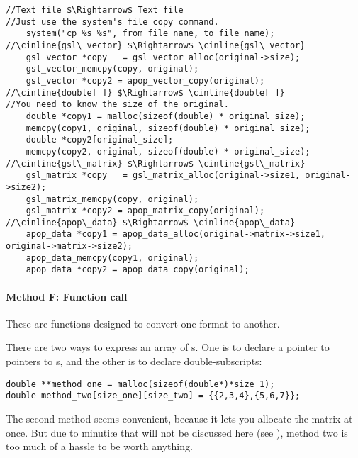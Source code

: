  
  
\begin{lstlisting}
//Text file $\Rightarrow$ Text file
//Just use the system's file copy command.
    system("cp %s %s", from_file_name, to_file_name);
//\cinline{gsl\_vector} $\Rightarrow$ \cinline{gsl\_vector}
    gsl_vector *copy   = gsl_vector_alloc(original->size);
    gsl_vector_memcpy(copy, original);
    gsl_vector *copy2 = apop_vector_copy(original);
//\cinline{double[ ]} $\Rightarrow$ \cinline{double[ ]}
//You need to know the size of the original.
    double *copy1 = malloc(sizeof(double) * original_size);
    memcpy(copy1, original, sizeof(double) * original_size);
    double *copy2[original_size];
    memcpy(copy2, original, sizeof(double) * original_size);
//\cinline{gsl\_matrix} $\Rightarrow$ \cinline{gsl\_matrix}
    gsl_matrix *copy   = gsl_matrix_alloc(original->size1, original->size2);
    gsl_matrix_memcpy(copy, original);
    gsl_matrix *copy2 = apop_matrix_copy(original);
//\cinline{apop\_data} $\Rightarrow$ \cinline{apop\_data}
    apop_data *copy1 = apop_data_alloc(original->matrix->size1, original->matrix->size2);
    apop_data_memcpy(copy1, original);
    apop_data *copy2 = apop_data_copy(original);
\end{lstlisting}

\paragraph{Method F: Function call}
 
 
 

These are functions designed to convert one format to another.

There are two ways to express an array of s. One is to
declare a pointer to pointers to s, and the other is to
declare double-subscripts:
\begin{lstlisting}
double **method_one = malloc(sizeof(double*)*size_1);
double method_two[size_one][size_two] = {{2,3,4},{5,6,7}};
\end{lstlisting}
The second method seems convenient, because it lets you allocate the
matrix at once. But due to minuti\ae{} that will not be discussed here
(see \citet[p 113]{kandr:c}), method two is too much of a hassle to
be worth anything. 

